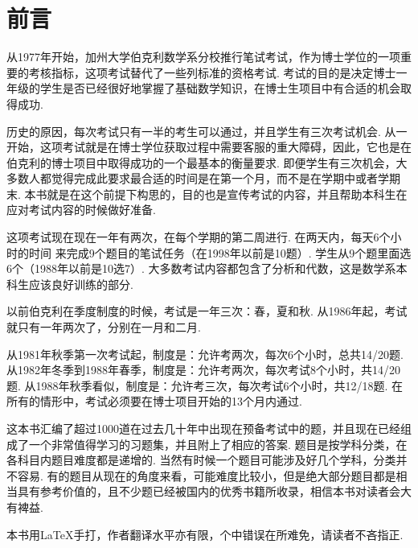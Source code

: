\chapter*{\kaishu 前言}
  从1977年开始，加州大学伯克利数学系分校推行笔试考试，作为博士学位的一项重要的考核指标，这项考试替代了一些列标准的资格考试. 考试的目的是决定博士一年级的学生是否已经很好地掌握了基础数学知识，在博士生项目中有合适的机会取得成功.

  历史的原因，每次考试只有一半的考生可以通过，并且学生有三次考试机会. 从一开始，这项考试就是在博士学位获取过程中需要客服的重大障碍，因此，它也是在伯克利的博士项目中取得成功的一个最基本的衡量要求. 即便学生有三次机会，大多数人都觉得完成此要求最合适的时间是在第一个月，而不是在学期中或者学期末. 本书就是在这个前提下构思的，目的也是宣传考试的内容，并且帮助本科生在应对考试内容的时候做好准备.

  这项考试现在现在一年有两次，在每个学期的第二周进行. 在两天内，每天6个小时的时间
  来完成9个题目的笔试任务（在1998年以前是10题）. 学生从9个题里面选6个（1988年以前是10选7）. 大多数考试内容都包含了分析和代数，这是数学系本科生应该良好训练的部分. 

  以前伯克利在季度制度的时候，考试是一年三次：春，夏和秋. 从1986年起，考试就只有一年两次了，分别在一月和二月.

  从1981年秋季第一次考试起，制度是：允许考两次，每次6个小时，总共14/20题. 从1982年冬季到1988年春季，制度是：允许考两次，每次考试8个小时，共14/20题. 从1988年秋季看似，制度是：允许考三次，每次考试6个小时，共12/18题. 在所有的情形中，考试必须要在博士项目开始的13个月内通过.
  
  这本书汇编了超过1000道在过去几十年中出现在预备考试中的题，并且现在已经组成了一个非常值得学习的习题集，并且附上了相应的答案. 题目是按学科分类，在各科目内题目难度都是递增的. 当然有时候一个题目可能涉及好几个学科，分类并不容易. 有的题目从现在的角度来看，可能难度比较小，但是绝大部分题目都是相当具有参考价值的，且不少题已经被国内的优秀书籍所收录，相信本书对读者会大有裨益.

  本书用\LaTeX{}手打，作者翻译水平亦有限，个中错误在所难免，请读者不吝指正. 